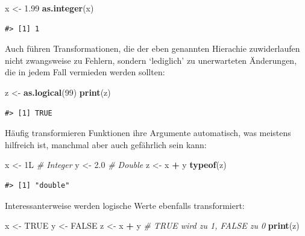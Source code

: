 \documentclass[]{book}
\newenvironment{Shaded}{\begin{snugshade}}{\end{snugshade}}
\newcommand{\KeywordTok}[1]{\textcolor[rgb]{0.13,0.29,0.53}{\textbf{#1}}}
\newcommand{\DecValTok}[1]{\textcolor[rgb]{0.00,0.00,0.81}{#1}}
\newcommand{\FloatTok}[1]{\textcolor[rgb]{0.00,0.00,0.81}{#1}}
\newcommand{\StringTok}[1]{\textcolor[rgb]{0.31,0.60,0.02}{#1}}
\newcommand{\CommentTok}[1]{\textcolor[rgb]{0.56,0.35,0.01}{\textit{#1}}}
\newcommand{\OtherTok}[1]{\textcolor[rgb]{0.56,0.35,0.01}{#1}}
\newcommand{\OperatorTok}[1]{\textcolor[rgb]{0.81,0.36,0.00}{\textbf{#1}}}
\newcommand{\NormalTok}[1]{#1}
\begin{document}
\begin{Shaded}
\begin{Highlighting}[]
\NormalTok{x <-}\StringTok{ }\FloatTok{1.99}
\KeywordTok{as.integer}\NormalTok{(x)}
\end{Highlighting}
\end{Shaded}

\begin{verbatim}
#> [1] 1
\end{verbatim}

Auch führen Transformationen, die der eben genannten Hierachie
zuwiderlaufen nicht zwangsweise zu Fehlern, sondern `lediglich' zu
unerwarteten Änderungen, die in jedem Fall vermieden werden sollten:

\begin{Shaded}
\begin{Highlighting}[]
\NormalTok{z <-}\StringTok{ }\KeywordTok{as.logical}\NormalTok{(}\DecValTok{99}\NormalTok{)}
\KeywordTok{print}\NormalTok{(z)}
\end{Highlighting}
\end{Shaded}

\begin{verbatim}
#> [1] TRUE
\end{verbatim}

Häufig transformieren Funktionen ihre Argumente automatisch, was
meistens hilfreich ist, manchmal aber auch gefährlich sein kann:

\begin{Shaded}
\begin{Highlighting}[]
\NormalTok{x <-}\StringTok{ }\NormalTok{1L }\CommentTok{# Integer}
\NormalTok{y <-}\StringTok{ }\FloatTok{2.0} \CommentTok{# Double}
\NormalTok{z <-}\StringTok{ }\NormalTok{x }\OperatorTok{+}\StringTok{ }\NormalTok{y}
\KeywordTok{typeof}\NormalTok{(z)}
\end{Highlighting}
\end{Shaded}

\begin{verbatim}
#> [1] "double"
\end{verbatim}

Interessanterweise werden logische Werte ebenfalls transformiert:

\begin{Shaded}
\begin{Highlighting}[]
\NormalTok{x <-}\StringTok{ }\OtherTok{TRUE}
\NormalTok{y <-}\StringTok{ }\OtherTok{FALSE}
\NormalTok{z <-}\StringTok{ }\NormalTok{x }\OperatorTok{+}\StringTok{ }\NormalTok{y }\CommentTok{# TRUE wird zu 1, FALSE zu 0}
\KeywordTok{print}\NormalTok{(z) }
\end{Highlighting}
\end{Shaded}
\end{document}
